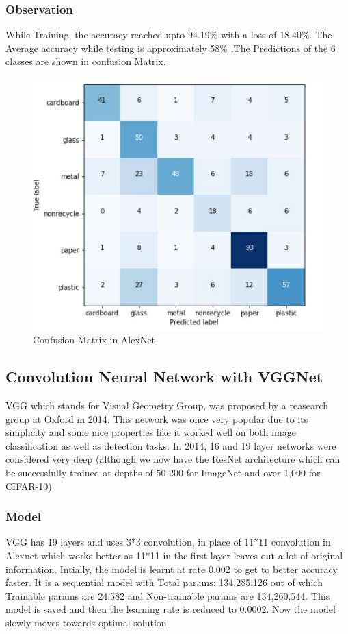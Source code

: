 \documentclass[10pt,twocolumn,letterpaper]{article}
\begin{document}
\subsubsection{Observation}
While Training, the accuracy reached upto 94.19\% with a loss of 18.40\%. The Average accuracy while testing is approximately 58\% .The Predictions of the 6 classes are shown in confusion Matrix.
\begin{figure}[h!]
    \centering
    \includegraphics[scale=0.4]{pic/AlexCM.JPG}
    \caption{Confusion Matrix in AlexNet}
    \label{fig:Confusion Matrix in AlexNet}
\end{figure}

\subsection{Convolution Neural Network with VGGNet}
VGG which stands for Visual Geometry Group, was proposed by a reasearch group at Oxford in 2014\cite{VGGnet}. This network was once very popular due to its simplicity and some nice properties like it worked well on both image classification as well as detection tasks. In 2014, 16 and 19 layer networks were considered very deep (although we now have the ResNet architecture which can be successfully trained at depths of 50-200 for ImageNet and over 1,000 for CIFAR-10)\cite{internet}
\subsubsection{Model}
VGG has 19 layers and uses 3*3 convolution, in place of 11*11 convolution in Alexnet which works better as 11*11 in the first layer leaves out a lot of original information. Intially, the model is learnt at rate 0.002 to get to better accuracy faster. 
It is a sequential model with Total params: 134,285,126 out of which Trainable params are 24,582 and Non-trainable params are 134,260,544. This model is saved and then the learning rate is reduced to 0.0002. Now the model slowly moves towards optimal solution.
\end{document}
